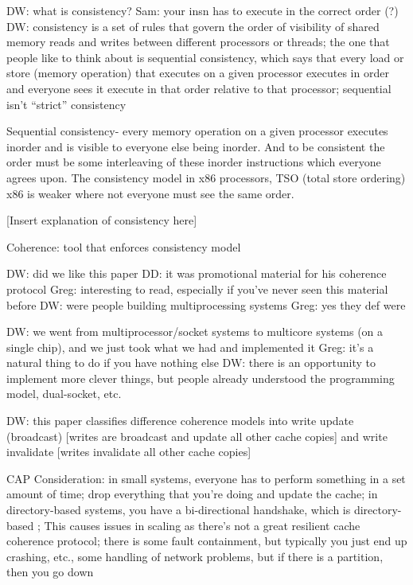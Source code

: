 DW: what is consistency?
Sam: your insn has to execute in the correct order (?)
DW: consistency is a set of rules that govern the order of visibility of shared memory reads and writes between different processors or threads; the one that people like to think about is sequential consistency, which says that every load or store (memory operation) that executes on a given processor executes in order and everyone sees it execute in that order relative to that processor; sequential isn't ``strict'' consistency

Sequential consistency- every memory operation on a given processor executes inorder and is visible to everyone else being inorder. And to be consistent the order must be some interleaving of these inorder instructions which everyone agrees upon. The consistency model in x86 processors, TSO (total store ordering) x86 is weaker where not everyone must see the same order.  


[Insert explanation of consistency here]

Coherence: tool that enforces consistency model

DW: did we like this paper
DD: it was promotional material for his coherence protocol
Greg: interesting to read, especially if you've never seen this material before
DW: were people building multiprocessing systems
Greg: yes they def were

DW: we went from multiprocessor/socket systems to multicore systems (on a single chip), and we just took what we had and implemented it
Greg: it's a natural thing to do if you have nothing else
DW: there is an opportunity to implement more clever things, but people already understood the programming model, dual-socket, etc.

DW: this paper classifies difference coherence models into write update (broadcast) [writes are broadcast and update all other cache copies] and write invalidate [writes invalidate all other cache copies]

CAP Consideration: in small systems, everyone has to perform something in a set amount of time; drop everything that you're doing and update the cache; in directory-based systems, you have a bi-directional handshake, which is directory-based ; This causes issues in scaling as there's not a great resilient cache coherence protocol; there is some fault containment, but typically you just end up crashing, etc., some handling of network problems, but if there is a partition, then you go down



